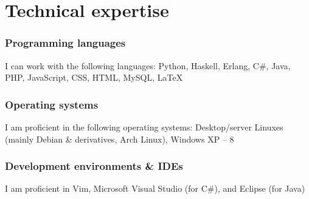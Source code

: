\documentclass{twocolcv}
\begin{document}
\section*{Technical expertise}
\subsubsection*{Programming languages}
I can work with the following languages: Python, Haskell, Erlang, C\#, Java, PHP, JavaScript, CSS, HTML, MySQL, \LaTeX
\subsubsection*{Operating systems}
I am proficient in the following operating systems: Desktop/server Linuxes (mainly Debian \& derivatives, Arch Linux), Windows XP -- 8
\subsubsection*{Development environments \& IDEs}
I am proficient in Vim, Microsoft Visual Studio (for C\#), and Eclipse (for Java)
\end{document}
